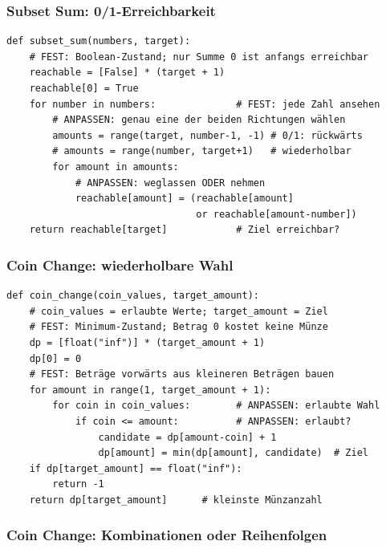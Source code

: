 \subsubsection{Subset Sum: 0/1-Erreichbarkeit}\label{sec:03-subset-sum}

\begin{codebox}
\begin{lstlisting}[style=CodeExpert]
def subset_sum(numbers, target):
    # FEST: Boolean-Zustand; nur Summe 0 ist anfangs erreichbar
    reachable = [False] * (target + 1)
    reachable[0] = True
    for number in numbers:              # FEST: jede Zahl ansehen
        # ANPASSEN: genau eine der beiden Richtungen wählen
        amounts = range(target, number-1, -1) # 0/1: rückwärts
        # amounts = range(number, target+1)   # wiederholbar
        for amount in amounts:
            # ANPASSEN: weglassen ODER nehmen
            reachable[amount] = (reachable[amount]
                                 or reachable[amount-number])
    return reachable[target]            # Ziel erreichbar?
\end{lstlisting}
\end{codebox}

\subsubsection{Coin Change: wiederholbare Wahl}\label{sec:03-coin-change}

\begin{codebox}
\begin{lstlisting}[style=CodeExpert]
def coin_change(coin_values, target_amount):
    # coin_values = erlaubte Werte; target_amount = Ziel
    # FEST: Minimum-Zustand; Betrag 0 kostet keine Münze
    dp = [float("inf")] * (target_amount + 1)
    dp[0] = 0
    # FEST: Beträge vorwärts aus kleineren Beträgen bauen
    for amount in range(1, target_amount + 1):
        for coin in coin_values:        # ANPASSEN: erlaubte Wahl
            if coin <= amount:          # ANPASSEN: erlaubt?
                candidate = dp[amount-coin] + 1
                dp[amount] = min(dp[amount], candidate)  # Ziel
    if dp[target_amount] == float("inf"):
        return -1
    return dp[target_amount]      # kleinste Münzanzahl
\end{lstlisting}
\end{codebox}

\subsubsection{Coin Change: Kombinationen oder Reihenfolgen}\label{sec:03-coin-combinations}

